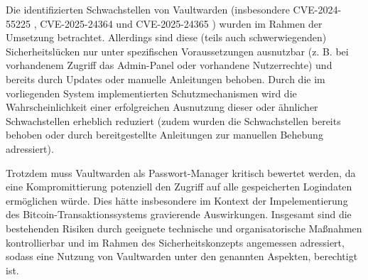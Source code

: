 Die identifizierten Schwachstellen von Vaultwarden (insbesondere CVE-2024-55225 \cite{nist_cve_2024_55225}, CVE-2025-24364 \cite{nist_cve_2025_24364} und CVE-2025-24365 \cite{nist_cve_2025_24365}) wurden im Rahmen der Umsetzung betrachtet. Allerdings sind diese  (teils auch schwerwiegenden) Sicherheitslücken nur unter spezifischen Voraussetzungen ausnutzbar (z. B. bei vorhandenem Zugriff das Admin-Panel oder vorhandene Nutzerrechte) und bereits durch Updates oder manuelle Anleitungen behoben. Durch die im vorliegenden System implementierten Schutzmechanismen wird die Wahrscheinlichkeit einer erfolgreichen Ausnutzung dieser oder ähnlicher Schwachstellen erheblich reduziert (zudem wurden die Schwachstellen bereits behoben oder durch bereitgestellte Anleitungen zur manuellen Behebung adressiert).

Trotzdem muss Vaultwarden als Passwort-Manager kritisch bewertet werden, da eine Kompromittierung potenziell den Zugriff auf alle gespeicherten Logindaten ermöglichen würde. Dies hätte insbesondere im Kontext der Impelementierung des Bitcoin-Transaktionssystems gravierende Auswirkungen. Insgesamt sind die bestehenden Risiken durch geeignete technische und organisatorische Maßnahmen kontrollierbar und im Rahmen des Sicherheitskonzepts angemessen adressiert, sodass eine Nutzung von Vaultwarden unter den genannten Aspekten, berechtigt ist.
